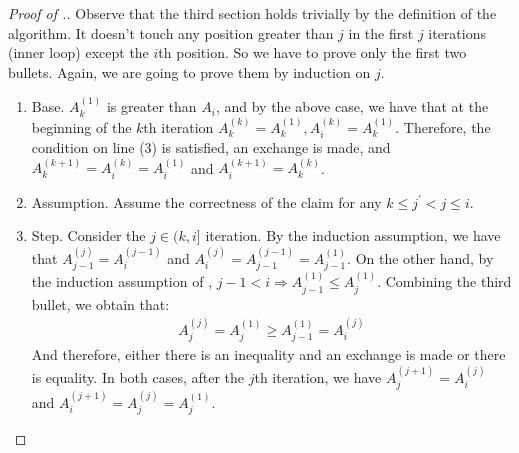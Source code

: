   \begin{proof}[Proof of .]
  Observe that the third section holds trivially by the definition of the algorithm. It doesn't touch any position greater than $j$ in the first $j$ iterations (inner loop) except the $i$th position. So we have to prove only the first two bullets. Again, we are going to prove them by induction on $j$.  
  \begin{enumerate}
    \item Base. $A^{(1)}_{k}$ is greater than $A_{i}$, and by the above case, we have that at the beginning of the $k$th iteration $A^{(k)}_{k}=A^{(1)}_{k}, A^{(k)}_{i}=A^{(1)}_{k}$. Therefore, the condition on line (3) is satisfied, an exchange is made, and $A^{(k+1)}_{k} =A^{(k)}_{i} = A^{(1)}_{i}$ and $A^{(k+1)}_{i} = A^{(k)}_{k}$. %
    \item Assumption. Assume the correctness of the claim for any $k \le j^{\prime} < j \le i$. 
    \item Step. Consider the $j \in (k,i]$ iteration. By the induction assumption, we have that $A^{(j)}_{j-1} = A^{(j-1)}_{i}$ and $A^{(j)}_{i} = A^{(j-1)}_{j-1} = A^{(1)}_{j-1}$. On the other hand, by the induction assumption of , $j-1 < i \Rightarrow A^{(1)}_{j-1} \le A^{(1)}_{j}$. Combining the third bullet, we obtain that:                
      \begin{equation*}
        \begin{split}
          A^{(j)}_{j} = A^{(1)}_{j} \ge A^{(1)}_{j-1} = A^{(j)}_{i}
        \end{split}
      \end{equation*}
      And therefore, either there is an inequality and an exchange is made or there is equality. In both cases, after the $j$th iteration, we have $A^{(j+1)}_{j} = A^{(j)}_{i}$ and $A^{(j+1)}_{i} = A^{(j)}_{j} = A^{(1)}_{j}$.
  \end{enumerate}
\end{proof}

